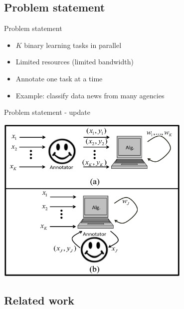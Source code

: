 \documentclass{beamer}
\begin{document}
\subsection{Problem statement}

\begin{frame}{Problem statement}
\begin{itemize}
\item $K$ binary learning tasks  in parallel\newline
\item Limited resources (limited bandwidth) \newline
\item Annotate one task at a time \newline

\item Example: classify data news from many agencies\newline
\end{itemize}
\end{frame}


\begin{frame}{Problem statement - update}
\begin{center}
\includegraphics[width=0.7\textwidth]{figs/SHAMPO_illustration.eps}
\end{center}
\end{frame}

\subsection{Related work}
\end{document}
